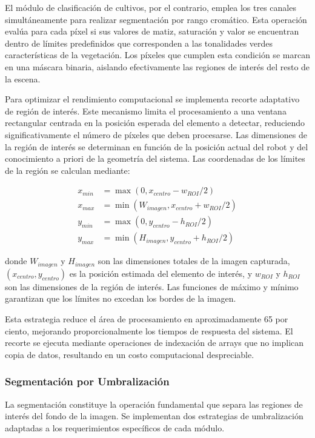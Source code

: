 El módulo de clasificación de cultivos, por el contrario, emplea los tres canales simultáneamente para realizar segmentación por rango cromático. Esta operación evalúa para cada píxel si sus valores de matiz, saturación y valor se encuentran dentro de límites predefinidos que corresponden a las tonalidades verdes características de la vegetación. Los píxeles que cumplen esta condición se marcan en una máscara binaria, aislando efectivamente las regiones de interés del resto de la escena.

Para optimizar el rendimiento computacional se implementa recorte adaptativo de región de interés. Este mecanismo limita el procesamiento a una ventana rectangular centrada en la posición esperada del elemento a detectar, reduciendo significativamente el número de píxeles que deben procesarse. Las dimensiones de la región de interés se determinan en función de la posición actual del robot y del conocimiento a priori de la geometría del sistema. Las coordenadas de los límites de la región se calculan mediante:

\begin{align}
x_{min} &= \max(0, x_{centro} - w_{ROI}/2) \\
x_{max} &= \min(W_{imagen}, x_{centro} + w_{ROI}/2) \\
y_{min} &= \max(0, y_{centro} - h_{ROI}/2) \\
y_{max} &= \min(H_{imagen}, y_{centro} + h_{ROI}/2)
\end{align}

donde $W_{imagen}$ y $H_{imagen}$ son las dimensiones totales de la imagen capturada, $(x_{centro}, y_{centro})$ es la posición estimada del elemento de interés, y $w_{ROI}$ y $h_{ROI}$ son las dimensiones de la región de interés. Las funciones de máximo y mínimo garantizan que los límites no excedan los bordes de la imagen.

Esta estrategia reduce el área de procesamiento en aproximadamente 65 por ciento, mejorando proporcionalmente los tiempos de respuesta del sistema. El recorte se ejecuta mediante operaciones de indexación de arrays que no implican copia de datos, resultando en un costo computacional despreciable.

\subsubsection{Segmentación por Umbralización}

La segmentación constituye la operación fundamental que separa las regiones de interés del fondo de la imagen. Se implementan dos estrategias de umbralización adaptadas a los requerimientos específicos de cada módulo.

